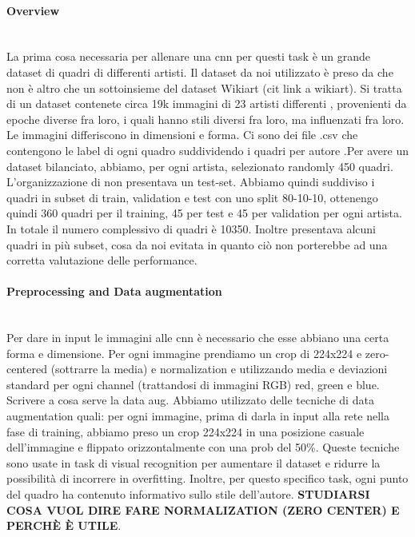 \documentclass{article}
\begin{document}
\paragraph{Overview}\mbox{}\\
La prima cosa necessaria per allenare una cnn per questi task è un grande dataset di quadri di differenti artisti. Il dataset da noi utilizzato è preso da \cite{ArtGANDataset} che non è altro che un sottoinsieme del dataset Wikiart (cit link a wikiart). Si tratta di un dataset contenete circa 19k immagini di 23 artisti differenti , provenienti da epoche diverse fra loro, i quali hanno stili diversi fra loro, ma influenzati fra loro. Le immagini differiscono in dimensioni e forma.  Ci sono dei file .csv che contengono le label di ogni quadro suddividendo i quadri per  autore .Per avere un dataset bilanciato, abbiamo, per ogni artista, selezionato randomly 450 quadri.
L'organizzazione di \cite{ArtGANDataset} non presentava un test-set. Abbiamo quindi suddiviso i quadri in subset di train, validation e test con uno split 80-10-10, ottenengo quindi 360 quadri per il training, 45 per test e 45 per validation per ogni artista. In totale il numero complessivo di quadri è 10350.
Inoltre \cite{ArtGANDataset} presentava alcuni quadri in più subset, cosa da noi evitata in quanto ciò non porterebbe ad una corretta valutazione delle performance.
\paragraph{Preprocessing and Data augmentation}\mbox{}\\
Per dare in input le immagini alle cnn è necessario che esse abbiano una certa forma e dimensione. Per ogni immagine prendiamo un crop di 224x224 e zero-centered (sottrarre la media) e normalization e utilizzando media e deviazioni standard per ogni channel (trattandosi di immagini RGB) red, green e blue. \\
Scrivere a cosa serve la data aug. Abbiamo utilizzato delle tecniche di data augmentation quali: per ogni immagine, prima di darla in input alla rete nella fase di training, abbiamo preso un crop 224x224 in una posizione casuale dell'immagine e flippato orizzontalmente con una prob del 50\%. Queste tecniche sono usate in task di visual recognition per aumentare il dataset e ridurre la possibilità di incorrere in overfitting.
Inoltre, per questo specifico task, ogni punto del quadro ha contenuto informativo sullo stile dell'autore.
\textbf{STUDIARSI COSA VUOL DIRE FARE NORMALIZATION (ZERO CENTER) E PERCHÈ È UTILE}.
\end{document}

